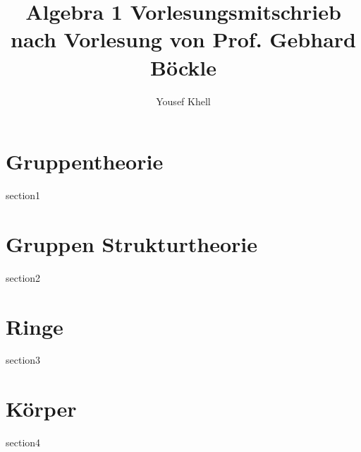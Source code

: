 \documentclass[a4paper]{report}
\title{\vspace{-2cm} Algebra 1 Vorlesungsmitschrieb\\nach Vorlesung von Prof. Gebhard Böckle}
\author{Yousef Khell}
\begin{document}
\maketitle
\tableofcontents

\chapter{Gruppentheorie}
{section1}

\chapter{Gruppen Strukturtheorie}
{section2}

\chapter{Ringe}
{section3}

\chapter{Körper}
{section4}
\end{document}
